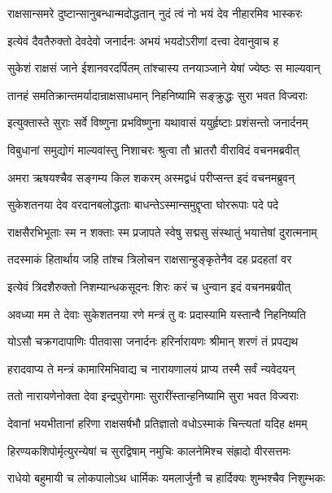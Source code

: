 \twolineshloka
{राक्षसान्समरे दुष्टान्सानुबन्धान्मदोद्धतान्}
{नुदं त्वं नो भयं देव नीहारमिव भास्करः} %

\twolineshloka
{इत्येवं दैवतैरुक्तो देवदेवो जनार्दनः}
{अभयं भयदोऽरीणां दत्त्वा देवानुवाच ह} %

\twolineshloka
{सुकेशं राक्षसं जाने ईशानवरदर्पितम्}
{तांश्चास्य तनयाञ्जाने येषां ज्येष्ठः स माल्यवान्} %

\twolineshloka
{तानहं समतिक्रान्तमर्यादान्राक्षसाधमान्}
{निहनिष्यामि सङ्क्रुद्धः सुरा भवत विज्वराः} %

\twolineshloka
{इत्युक्तास्ते सुराः सर्वे विष्णुना प्रभविष्णुना}
{यथावासं ययुर्हृष्टाः प्रशंसन्तो जनार्दनम्} %

\twolineshloka
{विबुधानां समुद्योगं माल्यवांस्तु निशाचरः}
{श्रुत्वा तौ भ्रातरौ वीराविदं वचनमब्रवीत्} %

\twolineshloka
{अमरा ऋषयश्चैव सङ्गम्य किल शकरम्}
{अस्मद्वधं परीप्सन्त इदं वचनमब्रुवन्} %

\twolineshloka
{सुकेशतनया देव वरदानबलोद्धताः}
{बाधन्तेऽस्मान्समुद्दृप्ता घोररूपाः पदे पदे} %

\twolineshloka
{राक्षसैरभिभूताः स्म न शक्ताः स्म प्रजापते}
{स्वेषु सद्मसु संस्थातुं भयात्तेषां दुरात्मनाम्} %

\twolineshloka
{तदस्माकं हितार्थाय जहि तांश्च त्रिलोचन}
{राक्षसान्हुङ्कृतेनैव दह प्रदहतां वर} %

\twolineshloka
{इत्येवं त्रिदशैरुक्तो निशम्यान्धकसूदनः}
{शिरः करं च धुन्वान इदं वचनमब्रवीत्} %

\twolineshloka
{अवध्या मम ते देवाः सुकेशतनया रणे}
{मन्त्रं तु वः प्रदास्यामि यस्तान्वै निहनिष्यति} %

\twolineshloka
{योऽसौ चक्रगदापाणिः पीतवासा जनार्दनः}
{हरिर्नारायणः श्रीमान् शरणं तं प्रपद्यथ} %

\twolineshloka
{हरादवाप्य ते मन्त्रं कामारिमभिवाद्य च}
{नारायणालयं प्राप्य तस्मै सर्वं न्यवेदयन्} %

\twolineshloka
{ततो नारायणेनोक्ता देवा इन्द्रपुरोगमाः}
{सुरारींस्तान्हनिष्यामि सुरा भवत विज्वराः} %

\twolineshloka
{देवानां भयभीतानां हरिणा राक्षसर्षभौ}
{प्रतिज्ञातो वधोऽस्माकं चिन्त्यतां यदिह क्षमम्} %

\twolineshloka
{हिरण्यकशिपोर्मृत्युरन्येषां च सुरद्विषाम्}
{नमुचिः कालनेमिश्च संह्रादो वीरसत्तमः} %

\twolineshloka
{राधेयो बहुमायी च लोकपालोऽथ धार्मिकः}
{यमलार्जुनौ च हार्दिक्यः शुम्भश्चैव निशुम्भकः} %

